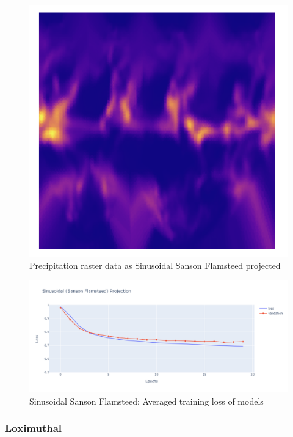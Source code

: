 \begin{figure}[h]
\begin{minipage}{0.30\textwidth}
        \label{fig:ig_proj}
    \end{minipage}\hfill
    \begin{minipage}{0.30\textwidth}
        \centering
        \includegraphics[width=0.9\linewidth]{figures/chapter-8/prect_goode.png}
        \caption{Precipitation raster data as Sinusoidal Sanson Flamsteed projected}
        \label{fig:ig_prect_raster}
    \end{minipage}\hfill
\end{figure}


\begin{figure}[h]
    \centering
    \includegraphics[width=1.0\linewidth]{figures/chapter-8/sinu_loss.png}
    \caption{Sinusoidal Sanson Flamsteed: Averaged training loss of models  }
    \label{fig:sinu_loss}
\end{figure}
\subsubsection*{Loximuthal}
